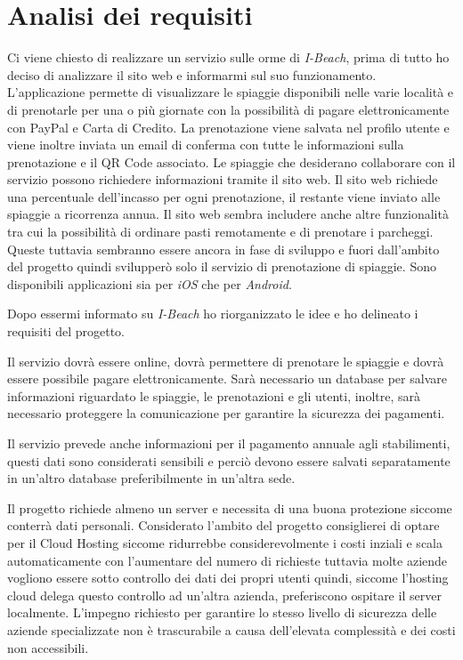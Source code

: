 \section{Analisi dei requisiti}
Ci viene chiesto di realizzare un servizio sulle orme di \emph{I-Beach}, prima di tutto ho deciso di analizzare il sito web e informarmi sul suo funzionamento. L'applicazione permette di visualizzare le spiaggie disponibili nelle varie localit\`a e di prenotarle per una o pi\`u giornate con la possibilit\`a di pagare elettronicamente con PayPal e Carta di Credito. La prenotazione viene salvata nel profilo utente e viene inoltre inviata un email di conferma con tutte le informazioni sulla prenotazione e il QR Code associato. Le spiaggie che desiderano collaborare con il servizio possono richiedere informazioni tramite il sito web. Il sito web richiede una percentuale dell'incasso per ogni prenotazione, il restante viene inviato alle spiaggie a ricorrenza annua. Il sito web sembra includere anche altre funzionalit\`a tra cui la possibilit\`a di ordinare pasti remotamente e di prenotare i parcheggi. Queste tuttavia sembranno essere ancora in fase di sviluppo e fuori dall'ambito del progetto quindi svilupper\`o solo il servizio di prenotazione di spiaggie. Sono disponibili applicazioni sia per \emph{iOS} che per \emph{Android}. 

Dopo essermi informato su \emph{I-Beach} ho riorganizzato le idee e ho delineato i requisiti del progetto.

Il servizio dovr\`a essere online, dovr\`a permettere di prenotare le spiaggie e dovr\`a essere possibile pagare elettronicamente. Sar\`a necessario un database per salvare informazioni riguardato le spiaggie, le prenotazioni e gli utenti, inoltre, sar\`a necessario proteggere la comunicazione per garantire la sicurezza dei pagamenti.

Il servizio prevede anche informazioni per il pagamento annuale agli stabilimenti, questi dati sono considerati sensibili e perci\`o devono essere salvati separatamente in un'altro database preferibilmente in un'altra sede.

Il progetto richiede almeno un server e necessita di una buona protezione siccome conterr\`a dati personali. Considerato l'ambito del progetto consiglierei di optare per il Cloud Hosting siccome ridurrebbe considerevolmente i costi inziali e scala automaticamente con l'aumentare del numero di richieste tuttavia molte aziende vogliono essere sotto controllo dei dati dei propri utenti quindi, siccome l'hosting cloud delega questo controllo ad un'altra azienda, preferiscono ospitare il server localmente. L'impegno richiesto per garantire lo stesso livello di sicurezza delle aziende specializzate non \`e trascurabile a causa dell'elevata complessit\`a e dei costi non accessibili.
